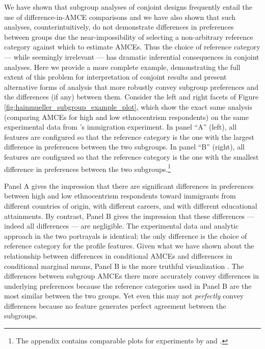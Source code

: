 \documentclass[a4paper,12pt]{article}\usepackage[]{graphicx}\usepackage[]{color}
\begin{document}
We have shown that subgroup analyses of conjoint designs frequently entail the use of difference-in-AMCE comparisons and we have also shown that such analyses, counterintuitively, do not demonstrate differences in preferences between groups due the near-impossibility of selecting a non-arbitrary reference category against which to estimate AMCEs. Thus the choice of reference category --- while seemingly irrelevant --- has dramatic inferential consequences in conjoint analyses. Here we provide a more complete example, demonstrating the full extent of this problem for interpretation of conjoint results and present alternative forms of analysis that more robustly convey subgroup preferences and the differences (if any) between them. Consider the left and right facets of Figure \ref{fig:hainmueller_subgroup_example_plot}, which show the exact same analysis (comparing AMCEs for high and low ethnocentrism respondents) on the same experimental data from \citeauthor{HainmuellerHopkinsYamamoto2014}'s immigration experiment. In panel ``A'' (left), all features are configured so that the reference category is the one with the largest difference in preferences between the two subgroups. In panel ``B'' (right), all features are configured so that the reference category is the one with the smallest difference in preferences between the two subgroups.\footnote{The appendix contains comparable plots for experiments by \citet{BallardRosaMartinScheve2016} and \citet{TeeleKallaRosenbluth2018}.}

Panel A gives the impression that there are significant differences in preferences between high and low ethnocentrism respondents toward immigrants from different countries of origin, with different careers, and with different educational attainments. By contrast, Panel B gives the impression that these differences --- indeed all differences --- are negligible. The experimental data and analytic approach in the two portrayals is identical; the only difference is the choice of reference category for the profile features. Given what we have shown about the relationship between differences in conditional AMCEs and differences in conditional marginal means, Panel B is the more truthful visualization \citep{Cairo2016}. The differences between subgroup AMCEs there more accurately convey differences in underlying preferences because the reference categories used in Panel B are the most similar between the two groups. Yet even this may not \textit{perfectly} convey differences because no feature generates perfect agreement between the subgroups.
\end{document}
